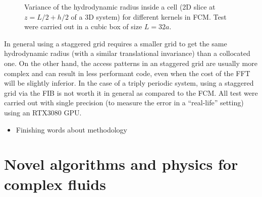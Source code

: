 \documentclass[ twoside,openright,titlepage,numbers=noenddot,%
headinclude,footinclude,cleardoublepage=empty,abstract=on,
BCOR=5mm,paper=a4,fontsize=11pt, dvipsnames
]{scrreprt}
\newcommand{\gpu}{\gls{GPU}\xspace}
\begin{document}
\begin{figure}[H]
  \label{fig:ibm_gauss10pt}
  \caption{Variance of the hydrodynamic radius inside a cell (2D slice at $z=L/2+h/2$ of a 3D system) for different kernels in \gls{FCM}. Test were carried out in a cubic box of size $L=32a$.}
\end{figure}

In general using a staggered grid requires a smaller grid to get the same hydrodynamic radius (with a similar translational invariance) than a collocated one. On the other hand, the access patterns in an staggered grid are usually more complex and can result in less performant code, even when the cost of the FFT will be slightly inferior. In the case of a triply periodic system, using a staggered grid via the \gls{FIB} is not worth it in general as compared to the \gls{FCM}.
All test were carried out with single precision (to measure the error in a ``real-life'' setting) using an RTX3080 \gpu.


\begin{itemize}
\item Finishing words about methodology
\end{itemize}

\cleardoublepage

\ctparttext{}
\part{Novel algorithms and physics for complex fluids}\label{pt:algo}
\end{document}

